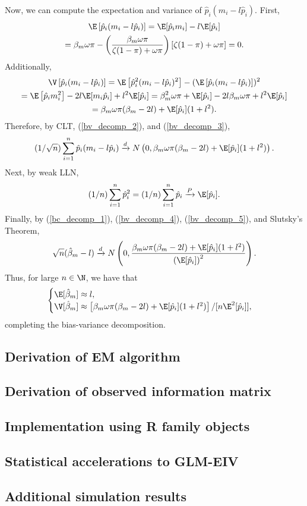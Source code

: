 \documentclass[12pt]{article}
\begin{document}
Now, we can compute the expectation and variance of $\hat{p}_i(m_i - l\hat{p}_i)$. First,
\begin{multline}\label{bv_decomp_2}
\E\left[\hat{p}_i(m_i - l\hat{p}_i) \right] = \E[\hat{p}_i m_i] - l \E[\hat{p}_i] \\ = \beta_m \omega \pi - \left(\frac{\beta_m \omega \pi}{\zeta (1-\pi) + \omega \pi}\right)[\zeta (1-\pi) + \omega \pi] = 0.
\end{multline}
Additionally,
\begin{multline}\label{bv_decomp_3}
\V\left[\hat{p}_i(m_i - l\hat{p}_i)\right] = \E\left[\hat{p}_i^2(m_i - l\hat{p}_i)^2\right] - (\E\left[ \hat{p}_i(m_i - l\hat{p}_i)\right])^2 \\ = \E\left[ \hat{p}_i m_i^2\right] - 2l \E[m_i\hat{p}_i] +l^2 \E[\hat{p}_i]= \beta^2_m \omega \pi + \E[ \hat{p}_i] -2l \beta_m \omega \pi + l^2 \E[\hat{p}_i] \\ = \beta_m\omega\pi(\beta_m - 2l) + \E[\hat{p}_i](1 + l^2).
\end{multline}
Therefore, by CLT, (\ref{bv_decomp_2}), and (\ref{bv_decomp_3}),
\begin{equation}\label{bv_decomp_4}
(1/\sqrt{n})\sum_{i=1}^n \hat{p}_i(m_i - l \hat{p}_i) \xrightarrow{d} N\left(0, \beta_m\omega\pi(\beta_m - 2l) + \E[\hat{p}_i](1 + l^2) \right).
\end{equation}
Next, by weak LLN,
\begin{equation}\label{bv_decomp_5}
(1/n) \sum_{i=1}^n \hat{p}_i^2 = (1/n) \sum_{i=1}^n \hat{p}_i \xrightarrow{P} \E[\hat{p}_i].
\end{equation}
Finally, by (\ref{bc_decomp_1}), (\ref{bv_decomp_4}), (\ref{bv_decomp_5}), and Slutsky's Theorem,
$$ \sqrt{n}(\hat{\beta}_m - l) \xrightarrow{d} N\left(0, \frac{ \beta_m\omega\pi(\beta_m - 2l) + \E[\hat{p}_i](1 + l^2) }{\left(\E[\hat{p}_i]\right)^2} \right).$$ Thus, for large $n \in \N$, we have that 
$$ \begin{cases}
\E [\hat{\beta}_m] \approx l, \\
\V[\hat{\beta}_m] \approx \left[\beta_m\omega\pi(\beta_m - 2l) + \E[\hat{p}_i](1 + l^2)\right]/[n\E^2[\hat{p}_i]],
\end{cases}$$
completing the bias-variance decomposition.

\subsection{Derivation of EM algorithm}

\subsection{Derivation of observed information matrix}

\subsection{Implementation using R family objects}

\subsection{Statistical accelerations to GLM-EIV}

\subsection{Additional simulation results}



\newpage

\end{document}
